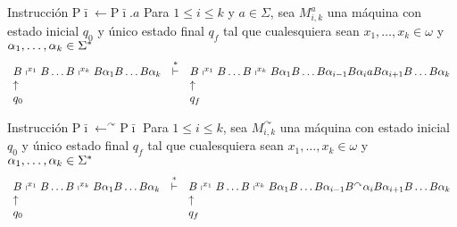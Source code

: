 \begin{frame}
	\begin{block}{Instrucción $\mathrm{P}\bar{\imath} \leftarrow \mathrm{P}\bar{\imath}.a$}
		\PN Para $1 \leq i \leq k$ y $a \in \Sigma $, sea $M_{i,k}^{a}$ una máquina con estado inicial $q_{0}$ y único
		estado final $q_{f}$ tal que cualesquiera sean $x_{1}, \dotsc, x_{k} \in \omega$ y $\alpha_{1}, \dotsc, \alpha_{k}
		\in \Sigma^{\ast}$
		\sizeOfLetterFirst
		\[
			\begin{array}{lcl}
				B \shortmid^{x_{1}} B \dotsc B \shortmid^{x_{k}} B \alpha_{1} B \dotsc B \alpha_{k} &\overset{\ast}{\vdash}& B
					\shortmid^{x_{1}} B \dotsc B \shortmid^{x_{k}} B \alpha_{1} B \dotsc B \alpha_{i-1} B \alpha_{i} a B
					\alpha_{i+1} B \dotsc B \alpha_{k} \\
				\uparrow && \uparrow \\
				q_{0} && q_{f}
			\end{array}
		\]
	\end{block}

  \begin{block}{Instrucción $\mathrm{P}\bar{\imath} \leftarrow ^{\curvearrowright}\mathrm{P}\bar{\imath}$}
		\PN Para $1 \leq i \leq k$, sea $M_{i,k}^{\curvearrowright}$ una máquina con estado inicial $q_{0}$ y único estado
		final $q_{f}$ tal que cualesquiera sean $x_{1}, \dotsc, x_{k} \in \omega$ y $\alpha_{1}, \dotsc, \alpha_{k} \in
		\Sigma^{\ast}$
    \sizeOfLetterFirst
    \[
      \begin{array}{lcl}
        B \shortmid^{x_{1}} B \dotsc B \shortmid^{x_{k}} B \alpha_{1} B \dotsc B \alpha_{k} &\overset{\ast}{\vdash}& B
          \shortmid^{x_{1}} B \dotsc B \shortmid^{x_{k}} B \alpha_{1} B \dotsc B \alpha_{i-1} B^{\curvearrowright}
          \alpha_{i} B \alpha_{i+1} B \dotsc B \alpha_{k} \\
        \uparrow && \uparrow \\
        q_{0} && q_{f}
      \end{array}
    \]
  \end{block}
\end{frame}
